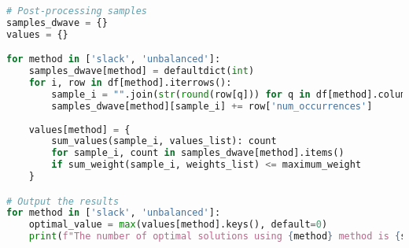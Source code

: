 \documentclass{article}
\begin{document}
\begin{lstlisting}[language=Python]
# Post-processing samples
samples_dwave = {}
values = {}

for method in ['slack', 'unbalanced']:
    samples_dwave[method] = defaultdict(int)
    for i, row in df[method].iterrows():
        sample_i = "".join(str(round(row[q])) for q in df[method].columns if q.startswith('x_'))
        samples_dwave[method][sample_i] += row['num_occurrences']
    
    values[method] = {
        sum_values(sample_i, values_list): count
        for sample_i, count in samples_dwave[method].items()
        if sum_weight(sample_i, weights_list) <= maximum_weight
    }

# Output the results
for method in ['slack', 'unbalanced']:
    optimal_value = max(values[method].keys(), default=0)
    print(f"The number of optimal solutions using {method} method is {samples_dwave[method][optimal_value]} out of 5000")


\end{lstlisting}
\end{document}
